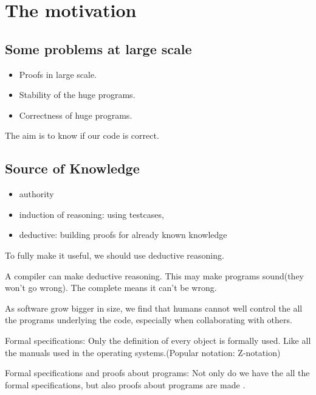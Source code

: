 \chapter{The motivation}

\section{Some problems at large scale}

\begin{itemize}
    \item Proofs in large scale.
    \item Stability of the huge programs.
    \item Correctness of huge programs. 
\end{itemize}

The aim is to know if our code is correct. 

\section{Source of Knowledge}

\begin{itemize}
    \item authority
    \item induction of reasoning: using testcases, 
    \item deductive: building proofs for already known knowledge
\end{itemize}

To fully make it useful, we should use deductive reasoning. 

 A compiler can make deductive reasoning. 
This may make programs sound(they won't go wrong). The complete means it can't
be wrong. 

 As software grow bigger in size, we find that humans
cannot well control the all the programs underlying the code, especially when
collaborating with others. 



Formal specifications: Only the definition of every object is formally used.
Like all the manuals used in the operating systems.(Popular notation:
Z-notation)

Formal specifications and proofs about programs: Not only do we have the all
the formal specifications, but also proofs about programs are made . 

